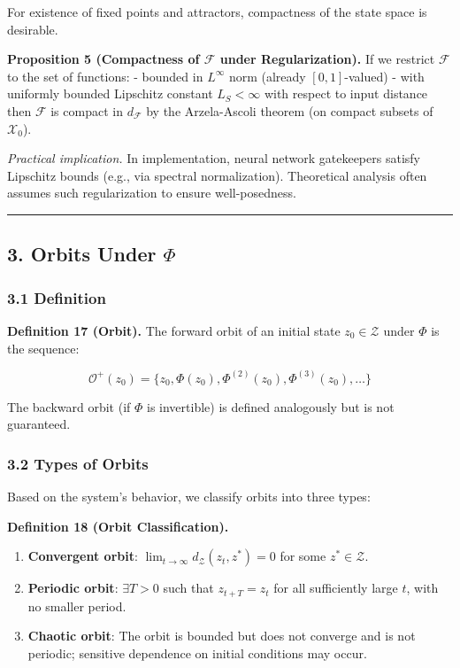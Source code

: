 \documentclass[
  12pt,
]{article}
\providecommand{\tightlist}{%
  \setlength{\itemsep}{0pt}\setlength{\parskip}{0pt}}
\begin{document}
For existence of fixed points and attractors, compactness of the state
space is desirable.

\textbf{Proposition 5 (Compactness of \(\mathcal{F}\) under
Regularization).} If we restrict \(\mathcal{F}\) to the set of
functions: - bounded in \(L^\infty\) norm (already \([0,1]\)-valued) -
with uniformly bounded Lipschitz constant \(L_S < \infty\) with respect
to input distance then \(\mathcal{F}\) is compact in \(d_{\mathcal{F}}\)
by the Arzela-Ascoli theorem (on compact subsets of \(\mathcal{X}_0\)).

\emph{Practical implication.} In implementation, neural network
gatekeepers satisfy Lipschitz bounds (e.g., via spectral normalization).
Theoretical analysis often assumes such regularization to ensure
well-posedness.

\begin{center}\rule{0.5\linewidth}{0.5pt}\end{center}

\subsection{\texorpdfstring{3. Orbits Under
\(\Phi\)}{3. Orbits Under \textbackslash Phi}}\label{orbits-under-phi}

\subsubsection{3.1 Definition}\label{definition}

\textbf{Definition 17 (Orbit).} The forward orbit of an initial state
\(z_0 \in \mathcal{Z}\) under \(\Phi\) is the sequence:

\[\mathcal{O}^+(z_0) = \{ z_0, \Phi(z_0), \Phi^{(2)}(z_0), \Phi^{(3)}(z_0), \dots \}\]

The backward orbit (if \(\Phi\) is invertible) is defined analogously
but is not guaranteed.

\subsubsection{3.2 Types of Orbits}\label{types-of-orbits}

Based on the system's behavior, we classify orbits into three types:

\textbf{Definition 18 (Orbit Classification).}

\begin{enumerate}
\def\labelenumi{\arabic{enumi}.}
\tightlist
\item
  \textbf{Convergent orbit}:
  \(\lim_{t\to\infty} d_{\mathcal{Z}}(z_t, z^*) = 0\) for some
  \(z^* \in \mathcal{Z}\).
\item
  \textbf{Periodic orbit}: \(\exists T > 0\) such that \(z_{t+T} = z_t\)
  for all sufficiently large \(t\), with no smaller period.
\item
  \textbf{Chaotic orbit}: The orbit is bounded but does not converge and
  is not periodic; sensitive dependence on initial conditions may occur.
\end{enumerate}
\end{document}
